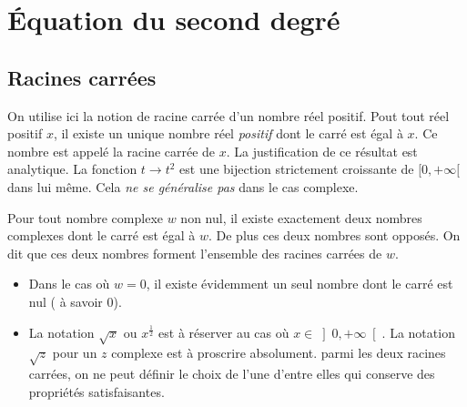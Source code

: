 \section{\'Equation du second degré}
\subsection{Racines carrées}
On utilise ici la notion de racine carrée d'un nombre réel positif. Pout tout réel positif $x$, il existe un unique nombre réel \emph{positif} dont le carré est égal à $x$. Ce nombre est appelé la racine carrée de $x$. La justification de ce résultat est analytique. La fonction $t\rightarrow t^2$ est une bijection strictement croissante de $[0,+\infty[$ dans lui même. Cela \emph{ne se généralise pas} dans le cas complexe.
\begin{prop}
 Pour tout nombre complexe $w$ non nul, il existe exactement deux nombres complexes dont le carré est égal à $w$. De plus ces deux nombres sont opposés. On dit que ces deux nombres forment l'ensemble des racines carrées de $w$.
\end{prop}
\begin{rems}
 \begin{itemize}
  \item Dans le cas où $w=0$, il existe évidemment un seul nombre dont le carré est nul ( à savoir $0$).
  \item La notation $\sqrt{x}$ ou $x^{\frac{1}{2}}$ est à réserver au cas où $x\in \left] 0,+\infty \right[ $. La notation $\sqrt{z}$ pour un $z$ complexe est à proscrire absolument. parmi les deux racines carrées, on ne peut définir le choix de l'une d'entre elles qui conserve des propriétés satisfaisantes.
 \end{itemize}
\end{rems}

